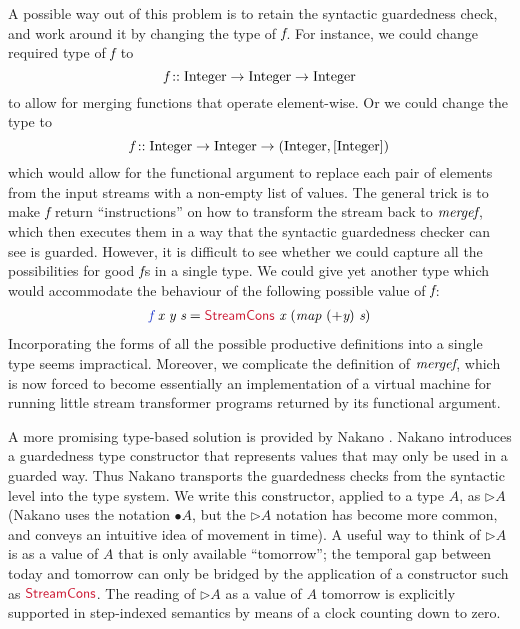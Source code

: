A possible way out of this problem is to retain the syntactic
guardedness check, and work around it by changing the type of
$\textit{f}$. For instance, we could change required type of
$\textit{f}$ to
\begin{displaymath}
  \textit{f} :: \textrm{Integer} \to \textrm{Integer} \to \textrm{Integer}
\end{displaymath}
to allow for merging functions that operate element-wise. Or we could
change the type to
\begin{displaymath}
  \textit{f} :: \textrm{Integer} \to \textrm{Integer} \to (\textrm{Integer}, [\textrm{Integer}])
\end{displaymath}
which would allow for the functional argument to replace each pair of
elements from the input streams with a non-empty list of values. The
general trick is to make $\textit{f}$ return ``instructions'' on how to
transform the stream back to $\textit{mergef}$, which then executes
them in a way that the syntactic guardedness checker can see is
guarded. However, it is difficult to see whether we could capture all
the possibilities for good $\textit{f}$s in a single type. We could
give yet another type which would accommodate the behaviour of the
following possible value of $\textit{f}$:
\begin{displaymath}
  \begin{array}{l}
    \defn{f}\ \ident{x}\ \ident{y}\ \ident{s} = \cons{StreamCons}\ \ident{x}\ (\ident{map}\ (+\ident{y})\ \ident{s})
  \end{array}
\end{displaymath}
Incorporating the forms of all the possible productive definitions
into a single type seems impractical. Moreover, we complicate the
definition of $\textit{mergef}$, which is now forced to become
essentially an implementation of a virtual machine for running little
stream transformer programs returned by its functional argument.

A more promising type-based solution is provided by Nakano
\cite{nakano00FIXME}. Nakano introduces a guardedness type constructor
that represents values that may only be used in a guarded way. Thus
Nakano transports the guardedness checks from the syntactic level into
the type system. We write this constructor, applied to a type $A$, as
$\rhd A$ (Nakano uses the notation $\bullet A$, but the $\rhd A$
notation has become more common, and conveys an intuitive idea of
movement in time). A useful way to think of $\rhd A$ is as a value of
$A$ that is only available ``tomorrow''; the temporal gap between
today and tomorrow can only be bridged by the application of a
constructor such as $\cons{StreamCons}$. The reading of $\rhd A$ as a
value of $A$ tomorrow is explicitly supported in step-indexed
semantics by means of a clock counting down to
zero. %

